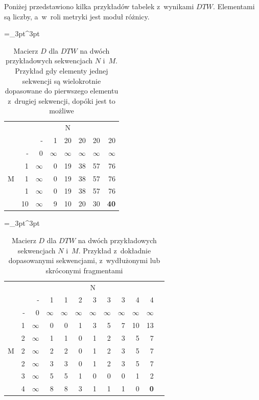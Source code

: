 Poniżej przedstawiono kilka przykładów tabelek z~wynikami $DTW$. Elementami są liczby, a~w~roli metryki jest moduł różnicy.

\begin{table}[H]
    \caption{Macierz $D$ dla $DTW$ na dwóch przykładowych sekwencjach $N$ i~$M$. Przykład gdy elementy jednej sekwencji są wielokrotnie dopasowane do pierwszego elementu z~drugiej sekwencji, dopóki jest to możliwe}
    \centering
    \label{tab:dtw_example0}
    \small
    \tabulinesep =_3pt^3pt
    \begin{tabu}{r*{7}{r}}
         & & 
        \\
        & & - & 1 & 20 & 20 & 20 & 20
        \\ \midrule
         & - & 0 & $\infty$ & $\infty$ & $\infty$ & $\infty$ & $\infty$
        \\
        & 1 & $\infty$ & 0 & 19 & 38 & 57 & 76
        \\
        & 1 & $\infty$ & 0 & 19 & 38 & 57 & 76
        \\
        & 1 & $\infty$ & 0 & 19 & 38 & 57 & 76
        \\
        & 10 & $\infty$ & 9 & 10 & 20 & 30 & \textbf{40}
        \\
    \end{tabu}
\end{table}

\begin{table}[H]
    \caption{Macierz $D$ dla $DTW$ na dwóch przykładowych sekwencjach $N$ i~$M$. Przykład z~dokładnie dopasowanymi sekwencjami, z~wydłużonymi lub skróconymi fragmentami}
    \centering
    \label{tab:dtw_example1}
    \small
    \tabulinesep =_3pt^3pt
    \begin{tabu}{r*{11}{r}}
         & & 
        \\
        & & - & 1 & 1 & 2 & 3 & 3 & 3 & 4 & 4
        \\ \midrule
         & - & 0 & $\infty$ & $\infty$ & $\infty$ & $\infty$ & $\infty$ & $\infty$ & $\infty$ & $\infty$
        \\
        & 1 & $\infty$ & 0 & 0 & 1 & 3 & 5 & 7 & 10 & 13
        \\
        & 2 & $\infty$ & 1 & 1 & 0 & 1 & 2 & 3 & 5 & 7
        \\
        & 2 & $\infty$ & 2 & 2 & 0 & 1 & 2 & 3 & 5 & 7
        \\
        & 2 & $\infty$ & 3 & 3 & 0 & 1 & 2 & 3 & 5 & 7
        \\
        & 3 & $\infty$ & 5 & 5 & 1 & 0 & 0 & 0 & 1 & 2
        \\
        & 4 & $\infty$ & 8 & 8 & 3 & 1 & 1 & 1 & 0 & \textbf{0}
        \\
    \end{tabu}
\end{table}

